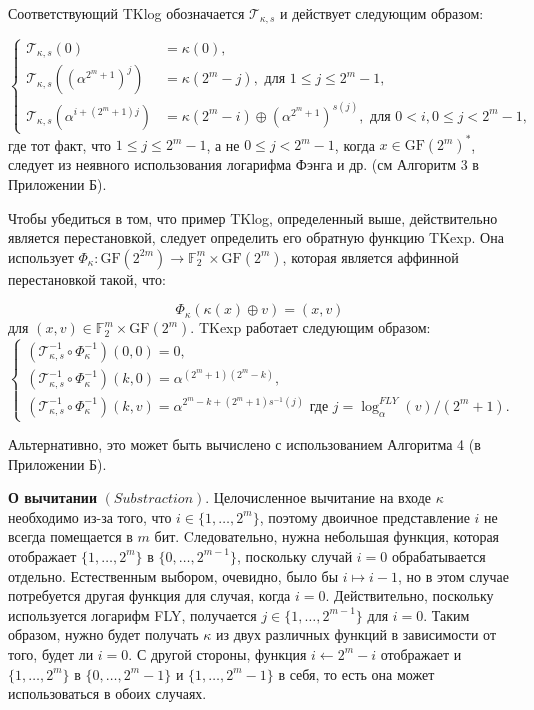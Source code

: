 Соответствующий TKlog обозначается \(\mathscr{T}_{\kappa,s}\) и действует следующим образом:

$$
\begin{cases}
  \mathscr{T}_{\kappa, s}(0) & =\kappa(0), \\
  \mathscr{T}_{\kappa, s}\left(\left(\alpha^{2^m+1}\right)^j\right) & =\kappa\left(2^m-j\right), \text { для } 1 \leq j \leq 2^m-1, \\
  \mathscr{T}_{\kappa, s}\left(\alpha^{i+\left(2^m+1\right) j}\right) & =\kappa\left(2^m-i\right) \oplus\left(\alpha^{2^m+1}\right)^{s(j)}, \text { для } 0<i, 0 \leq j<2^m-1,
\end{cases}
$$ где тот факт, что \(1 \leq j \leq 2^m - 1\), а не \(0 \leq j < 2^m - 1\), когда \(x \in \mathrm{GF}(2^m)^*\), следует из неявного использования логарифма Фэнга и др. (см Алгоритм 3 в Приложении Б).

Чтобы убедиться в том, что пример TKlog, определенный выше, действительно является перестановкой, следует определить его обратную функцию TKexp. Она использует \(\Phi_\kappa: \text{GF}(2^{2m}) \rightarrow \mathbb{F}^m_2 \times \text{GF}(2^m)\), которая является аффинной перестановкой такой, что:

\[
\Phi_\kappa(\kappa(x) \oplus v) = (x, v)
\] для \((x, v) \in \mathbb{F}^m_2 \times \text{GF}(2^m)\). TKexp работает следующим образом:
$$
\left\{\begin{array}{l}
  \left(\mathscr{T}_{\kappa, s}^{-1} \circ \Phi_\kappa^{-1}\right)(0,0)=0, \\
  \left(\mathscr{T}_{\kappa, s}^{-1} \circ \Phi_\kappa^{-1}\right)(k, 0)=\alpha^{\left(2^m+1\right)\left(2^m-k\right)}, \\
  \left(\mathscr{T}_{\kappa, s}^{-1} \circ \Phi_\kappa^{-1}\right)(k, v)=\alpha^{2^m-k+\left(2^m+1\right) s^{-1}(j)} \text { где } j=\log _\alpha^{F L Y}(v) /\left(2^m+1\right) .
  \end{array}\right.
$$

Альтернативно, это может быть вычислено с использованием Алгоритма 4 (в Приложении Б).

\textbf{О вычитании} \((Substraction).\) Целочисленное вычитание на входе \(\kappa\) необходимо из-за того, что \(i \in \{1, \ldots, 2^m\}\), поэтому двоичное представление \(i\) не всегда помещается в \(m\) бит. Cледовательно, нужна небольшая функция, которая отображает \(\{1, \ldots, 2^m\}\) в \(\{0, \ldots, 2^{m - 1}\}\), поскольку случай \(i = 0\) обрабатывается отдельно. Естественным выбором, очевидно, было бы \(i \mapsto i - 1\), но в этом случае потребуется другая функция для случая, когда \(i = 0\). Действительно, поскольку используется логарифм FLY, получается \(j \in \{1, \ldots, 2^{m - 1}\}\) для \(i = 0\). Таким образом, нужно будет получать \(\kappa\) из двух различных функций в зависимости от того, будет ли \(i = 0\). С другой стороны, функция \(i \leftarrow 2^m - i\) отображает и \(\{1, \ldots, 2^m\}\) в \(\{0, \ldots, 2^m - 1\}\) и \(\{1, \ldots, 2^m - 1\}\) в себя, то есть она может использоваться в обоих случаях.

